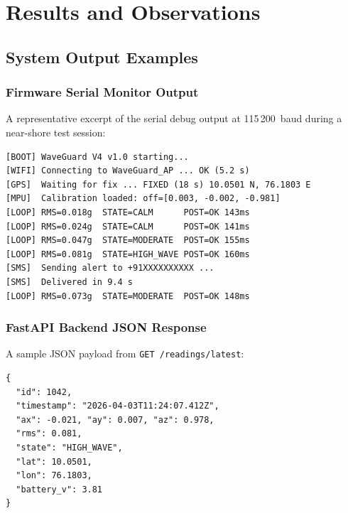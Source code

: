 
\chapter{Results and Observations}
\label{chap:results}

\section{System Output Examples}

\subsection{Firmware Serial Monitor Output}

A representative excerpt of the serial debug output at 115\,200~baud during a
near-shore test session:

\begin{lstlisting}[language={},caption={Serial monitor output during offshore test},label={lst:serial}]
[BOOT] WaveGuard V4 v1.0 starting...
[WIFI] Connecting to WaveGuard_AP ... OK (5.2 s)
[GPS]  Waiting for fix ... FIXED (18 s) 10.0501 N, 76.1803 E
[MPU]  Calibration loaded: off=[0.003, -0.002, -0.981]
[LOOP] RMS=0.018g  STATE=CALM      POST=OK 143ms
[LOOP] RMS=0.024g  STATE=CALM      POST=OK 141ms
[LOOP] RMS=0.047g  STATE=MODERATE  POST=OK 155ms
[LOOP] RMS=0.081g  STATE=HIGH_WAVE POST=OK 160ms
[SMS]  Sending alert to +91XXXXXXXXXX ...
[SMS]  Delivered in 9.4 s
[LOOP] RMS=0.073g  STATE=MODERATE  POST=OK 148ms
\end{lstlisting}

\subsection{FastAPI Backend JSON Response}

A sample JSON payload from \texttt{GET /readings/latest}:

\begin{lstlisting}[language={},caption={Sample API response},label={lst:api_response}]
{
  "id": 1042,
  "timestamp": "2026-04-03T11:24:07.412Z",
  "ax": -0.021, "ay": 0.007, "az": 0.978,
  "rms": 0.081,
  "state": "HIGH_WAVE",
  "lat": 10.0501,
  "lon": 76.1803,
  "battery_v": 3.81
}
\end{lstlisting}

